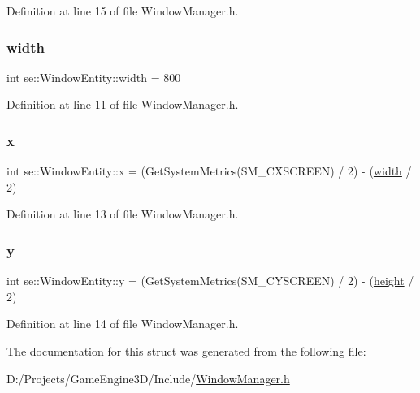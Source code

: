 Definition at line 15 of file Window\+Manager.\+h.

\mbox{\label{structse_1_1_window_entity_a131c1b7f2879d858fe72a7acf585acfe}} 
\subsubsection{\texorpdfstring{width}{width}}
{\footnotesize\ttfamily int se\+::\+Window\+Entity\+::width = 800}



Definition at line 11 of file Window\+Manager.\+h.

\mbox{\label{structse_1_1_window_entity_a44c91bca2e793ea0d8f98fbf3d97bad5}} 
\subsubsection{\texorpdfstring{x}{x}}
{\footnotesize\ttfamily int se\+::\+Window\+Entity\+::x = (Get\+System\+Metrics(S\+M\+\_\+\+C\+X\+S\+C\+R\+E\+EN) / 2) -\/ (\mbox{\hyperlink{structse_1_1_window_entity_a131c1b7f2879d858fe72a7acf585acfe}{width}} / 2)}



Definition at line 13 of file Window\+Manager.\+h.

\mbox{\label{structse_1_1_window_entity_aaf1f57802ee6ca59e01e8a2dc2245632}} 
\subsubsection{\texorpdfstring{y}{y}}
{\footnotesize\ttfamily int se\+::\+Window\+Entity\+::y = (Get\+System\+Metrics(S\+M\+\_\+\+C\+Y\+S\+C\+R\+E\+EN) / 2) -\/ (\mbox{\hyperlink{structse_1_1_window_entity_a03572351838f99dd81079c4808b127d7}{height}} / 2)}



Definition at line 14 of file Window\+Manager.\+h.



The documentation for this struct was generated from the following file\+:\begin{DoxyCompactItemize}
\item 
D\+:/\+Projects/\+Game\+Engine3\+D/\+Include/\mbox{\hyperlink{_window_manager_8h}{Window\+Manager.\+h}}\end{DoxyCompactItemize}
